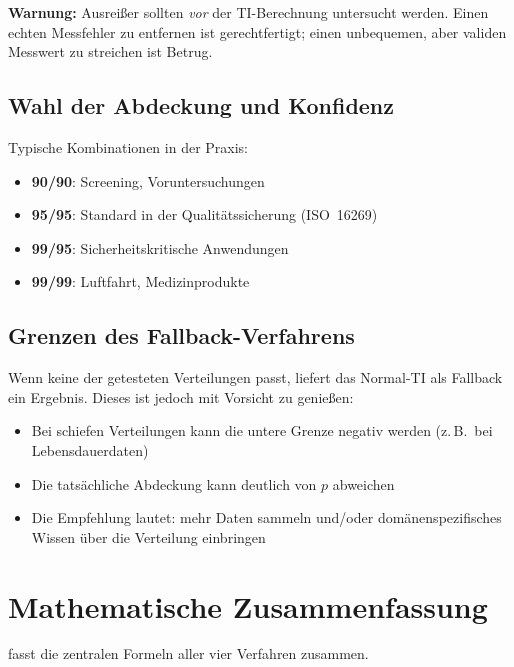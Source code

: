 \documentclass[10pt,a4paper,twocolumn]{article}
\theoremstyle{definition}
\newcommand{\warnung}[1]{%
    \begin{center}
    \colorbox{warnred}{\parbox{0.92\linewidth}{\small\textbf{Warnung:} #1}}
    \end{center}
}
\begin{document}
\warnung{Ausreißer sollten \emph{vor} der TI-Berechnung
untersucht werden. Einen echten Messfehler zu entfernen ist
gerechtfertigt; einen unbequemen, aber validen Messwert zu
streichen ist Betrug.}

\subsection{Wahl der Abdeckung und Konfidenz}

Typische Kombinationen in der Praxis:
\begin{itemize}[nosep,leftmargin=*]
    \item \textbf{90/90}: Screening, Voruntersuchungen
    \item \textbf{95/95}: Standard in der Qualitätssicherung (ISO~16269)
    \item \textbf{99/95}: Sicherheitskritische Anwendungen
    \item \textbf{99/99}: Luftfahrt, Medizinprodukte
\end{itemize}

\subsection{Grenzen des Fallback-Verfahrens}

Wenn keine der getesteten Verteilungen passt, liefert das
Normal-TI als Fallback ein Ergebnis. Dieses ist jedoch mit
Vorsicht zu genießen:
\begin{itemize}[nosep,leftmargin=*]
    \item Bei schiefen Verteilungen kann die untere Grenze
          negativ werden (z.\,B.\ bei Lebensdauerdaten)
    \item Die tatsächliche Abdeckung kann deutlich von $p$
          abweichen
    \item Die Empfehlung lautet: mehr Daten sammeln und/oder
          domänenspezifisches Wissen über die Verteilung einbringen
\end{itemize}


\section{Mathematische Zusammenfassung}
\label{sec:zusammenfassung}

 fasst die zentralen Formeln aller vier
Verfahren zusammen.
\end{document}
